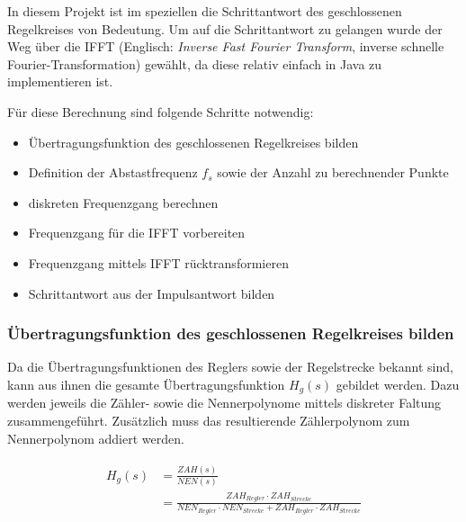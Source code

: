 In  diesem Projekt  ist  im speziellen  die  Schrittantwort des  geschlossenen
Regelkreises von  Bedeutung. Um auf die  Schrittantwort zu gelangen  wurde der
Weg \"uber die IFFT (Englisch:  \emph{Inverse Fast Fourier Transform}, inverse
schnelle Fourier-Transformation)  gew\"ahlt, da diese relativ  einfach in Java
zu implementieren ist.

F\"ur diese Berechnung sind folgende Schritte notwendig:

\begin{itemize}
    \item
        \"Ubertragungsfunktion des geschlossenen Regelkreises bilden
    \item
        Definition der Abstastfrequenz $f_s$ sowie der Anzahl zu berechnender Punkte
    \item
        diskreten Frequenzgang berechnen
    \item
        Frequenzgang f\"ur die IFFT vorbereiten
    \item
        Frequenzgang mittels IFFT r\"ucktransformieren
    \item
        Schrittantwort aus der Impulsantwort bilden
\end{itemize}


\subsubsection*{\"Ubertragungsfunktion des geschlossenen Regelkreises bilden}

Da  die \"Ubertragungsfunktionen  des Reglers  sowie der  Regelstrecke bekannt
sind,  kann aus  ihnen  die gesamte  \"Ubertragungsfunktion $H_g(s)$  gebildet
werden. Dazu  werden jeweils  die Z\"ahler-  sowie die  Nennerpolynome mittels
diskreter  Faltung  zusammengef\"uhrt. Zus\"atzlich   muss  das  resultierende
Z\"ahlerpolynom zum Nennerpolynom addiert werden.

\begin{gather} \label{eq:fft:hg}
    \begin{split}
        H_g(s)  & = \frac{ZAH(s)}{NEN(s)} \\
                & = \frac{ZAH_{Regler} \cdot ZAH_{Strecke}}{NEN_{Regler} \cdot NEN_{Strecke} + ZAH_{Regler} \cdot ZAH_{Strecke}}
    \end{split}
\end{gather}

